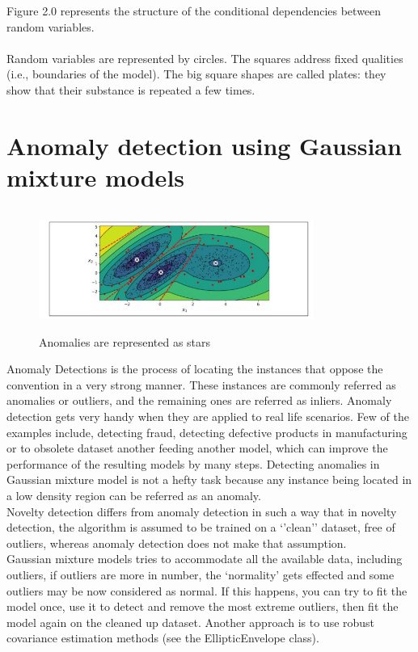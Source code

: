 \documentclass[conference]{IEEEtran}
\begin{document}
\newpage Figure 2.0 represents the structure of the conditional dependencies
between random variables. \\
\\
Random variables are represented by circles. The squares address fixed qualities (i.e., boundaries of the model). The big square shapes are called plates: they show that their substance is repeated a few times.

\section{Anomaly detection using Gaussian mixture models}

\begin{figure}[h]
    \centering
    \includegraphics[width=9cm,height=4cm]{anamoly.JPG}
    \caption{Anomalies are represented as stars}
    \label{}
\end{figure}

Anomaly Detections is the process of locating the instances that oppose the convention in a very strong manner. These instances are commonly referred as anomalies or outliers, and the remaining ones are referred as inliers. Anomaly detection gets very handy when they are applied to real life scenarios. Few of the examples include, detecting fraud, detecting defective products in manufacturing or to obsolete dataset another feeding another model, which can improve the performance of the resulting models by many steps. Detecting anomalies in Gaussian mixture model is not a hefty task because any instance being located in a low density region can be referred as an anomaly. \\
Novelty detection differs from anomaly detection in such a way that in novelty detection, the algorithm is assumed to be trained on a ‘’clean’’ dataset, free of outliers, whereas anomaly detection does not make that assumption.  \\
Gaussian mixture models tries to accommodate all the available data, including outliers, if outliers are more in number, the ‘normality’ gets effected and some outliers may be now considered as normal. If this happens, you can try to fit the model once, use it to detect and remove the most extreme outliers, then fit the model again on the cleaned up dataset. Another approach is to use robust covariance estimation methods (see the EllipticEnvelope class). 
\end{document}
